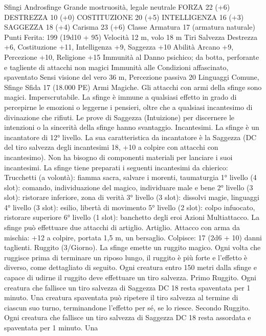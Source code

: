 \begin{multicols}{2}
Sfingi
Androsfinge
Grande mostruosità, legale neutrale
FORZA 22 (+6)
DESTREZZA 10 (+0)
COSTITUZIONE 20 (+5)
INTELLIGENZA 16 (+3)
SAGGEZZA 18 (+4)
Carisma 23 (+6)
Classe Armatura 17 (armatura naturale)
\hspace*{0pt}\hfill{Punti Ferita}: 199 (19d10 + 95)
Velocità 12 m, volo 18 m
Tiri Salvezza Destrezza +6, Costituzione +11, Intelligenza +9,
Saggezza +10
Abilità Arcano +9, Percezione +10, Religione +15
Immunità al Danno psichico; da botta, perforante e
tagliente di attacchi non magici
Immunità alle Condizioni affascinato, spaventato
Sensi visione del vero 36 m, Percezione passiva 20
Linguaggi Comune, Sfinge
Sfida 17 (18.000 PE)
Armi Magiche. Gli attacchi con armi della sfinge sono magici.
Imperscrutabile. La sfinge è immune a qualsiasi effetto in grado
di percepirne le emozioni o leggerne i pensieri, oltre che a
qualsiasi incantesimo di divinazione che rifiuti. Le prove di
Saggezza (Intuizione) per discernere le intenzioni o la sincerità
della sfinge hanno svantaggio.
Incantesimi. La sfinge è un incantatore di 12° livello. La sua
caratteristica da incantatore è la Saggezza (DC del tiro salvezza
degli incantesimi 18, +10 a colpire con attacchi con
incantesimo). Non ha bisogno di componenti materiali per
lanciare i suoi incantesimi. La sfinge tiene preparati i seguenti
incantesimi da chierico:
Trucchetti (a volontà): fiamma sacra, salvare i morenti,
taumaturgia
1° livello (4 slot): comando, individuazione del magico,
individuare male e bene
2° livello (3 slot): ristorare inferiore, zona di verità
3° livello (3 slot): dissolvi magie, linguaggi
4° livello (3 slot): esilio, libertà di movimento
5° livello (2 slot): colpo infuocato, ristorare superiore
6° livello (1 slot): banchetto degli eroi
Azioni
Multiattacco. La sfinge può effettuare due attacchi di artiglio.
Artiglio. Attacco con arma da mischia: +12 a colpire, portata 1,5
m, un bersaglio.
Colpisce: 17 (2d6 + 10) danni taglienti.
Ruggito (3/Giorno). La sfinge emette un ruggito magico. Ogni
volta che ruggisce prima di terminare un riposo lungo, il ruggito
è più forte e l’effetto è diverso, come dettagliato di seguito. Ogni
creatura entro 150 metri dalla sfinge e capace di udirne il ruggito
deve effettuare un tiro salvezza.
Primo Ruggito. Ogni creatura che fallisce un tiro salvezza di
Saggezza DC 18 resta spaventata per 1 minuto. Una creatura
spaventata può ripetere il tiro salvezza al termine di ciascun suo
turno, terminandone l’effetto per sé, se lo riesce.
Secondo Ruggito. Ogni creatura che fallisce un tiro salvezza di
Saggezza DC 18 resta assordata e spaventata per 1 minuto. Una

\end{multicols}
